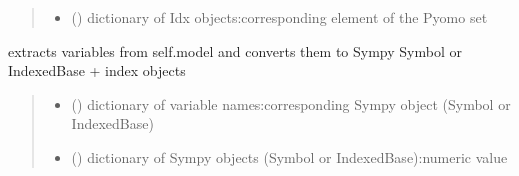 \documentclass[letterpaper,10pt,english]{sphinxmanual}
\begin{document}
\begin{fulllineitems}
\begin{fulllineitems}
\begin{quote}
\begin{description}
\begin{itemize}
\item {} 
\sphinxAtStartPar
{} () \textendash{} dictionary of Idx objects:corresponding element of the Pyomo set

\end{itemize}


\end{description}\end{quote}

\end{fulllineitems}


\begin{fulllineitems}
\label{\detokenize{src.sensitivity.sensitivity_tools:src.sensitivity.sensitivity_tools.AutoSympy.get_variables}}
\pysigstartsignatures
\pysiglinewithargsret
{}
{}
{}
\pysigstopsignatures
\sphinxAtStartPar
extracts variables from self.model and converts them to Sympy Symbol or IndexedBase + index objects
\begin{quote}\begin{description}
\sphinxAtStartPar
\begin{itemize}
\item {} 
\sphinxAtStartPar
{} () \textendash{} dictionary of variable names:corresponding Sympy object (Symbol or IndexedBase)

\item {} 
\sphinxAtStartPar
{} () \textendash{} dictionary of Sympy objects (Symbol or IndexedBase):numeric value

\end{itemize}


\end{description}\end{quote}

\end{fulllineitems}



\end{fulllineitems}
\end{document}
